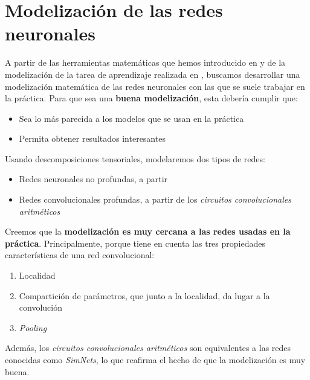 \chapter{Modelización de las redes neuronales} \label{ch:modelizacion}

A partir de las herramientas matemáticas que hemos introducido en  y de la modelización de la tarea de aprendizaje realizada en , buscamos desarrollar una modelización matemática de las redes neuronales con las que se suele trabajar en la práctica. Para que sea una \textbf{buena modelización}, esta debería cumplir que:

\begin{itemize}
    \item Sea lo más parecida a los modelos que se usan en la práctica
    \item Permita obtener resultados interesantes
\end{itemize}

Usando descomposiciones tensoriales, modelaremos dos tipos de redes:

\begin{itemize}
    \item Redes neuronales no profundas, a partir
    \item Redes convolucionales profundas, a partir de los \textit{circuitos convolucionales aritméticos}
\end{itemize}

Creemos que la \textbf{modelización es muy cercana a las redes usadas en la práctica}. Principalmente, porque tiene en cuenta las tres propiedades características de una red convolucional:

\begin{enumerate}
    \item Localidad
    \item Compartición de parámetros, que junto a la localidad, da lugar a la convolución
    \item \textit{Pooling}
\end{enumerate}

Además, los \textit{circuitos convolucionales aritméticos} son equivalentes a las redes conocidas como \textit{SimNets}, lo que reafirma el hecho de que la modelización es muy buena.

